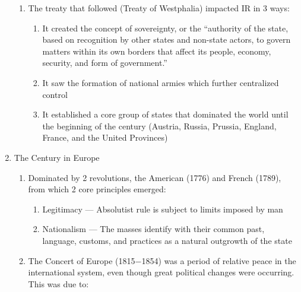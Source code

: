 \documentclass[12pt]{article}
\begin{document}
\begin{enumerate}
\begin{enumerate}
          \item The treaty that followed (Treaty of Westphalia) impacted IR in 3 ways:

            \begin{enumerate}

              \item It created the concept of sovereignty, or the “authority of the state, based on recognition by other states and non-state actors, to govern matters within its own borders that affect its people, economy, security, and form of government.”

              \item It saw the formation of national armies which further centralized control

              \item It established a core group of states that dominated the world until the beginning of the  century (Austria, Russia, Prussia, England, France, and the United Provinces)

            \end{enumerate}

        \end{enumerate}

      \item The  Century in Europe

        \begin{enumerate}

          \item Dominated by 2 revolutions, the American (1776) and French (1789), from which 2 core principles emerged:

            \begin{enumerate}

              \item Legitimacy — Absolutist rule is subject to limits imposed by man

              \item Nationalism — The masses identify with their common past, language, customs, and practices as a natural outgrowth of the state

            \end{enumerate}

          \item The Concert of Europe (1815$-$1854) was a period of relative peace in the international system, even though great political changes were occurring. This was due to:

            \begin{enumerate}


\end{enumerate}
\end{enumerate}
\end{enumerate}
\end{document}
